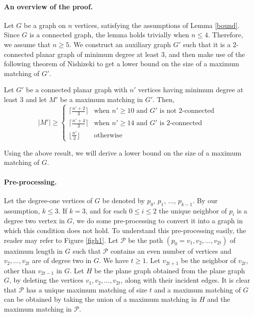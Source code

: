 \paragraph{\textbf{An overview of the proof.}}
Let $G$ be a graph on $n$ vertices, satisfying the assumptions of Lemma \ref{bound}. Since $G$ is a connected graph, the lemma holds trivially 
when $n \le 4$. Therefore, we assume that $n \ge 5$. We construct an auxiliary graph $G'$ such that it is a $2$-connected planar graph of minimum 
degree at least $3$, and then make use of the following theorem of Nishizeki \cite{Nishi} to get a lower bound on the size of a maximum matching of $G'$.
\begin{theorem}\label{thmnishi}
 Let $G'$ be a connected planar graph with $n'$ vertices having minimum degree at least $3$ and let $M'$ be a maximum matching in $G'$. Then,
$$
|M'| \ge \left\{ \begin{array}{rl}
 \lceil \frac{n'+2}{3} \rceil &\mbox{when $n' \ge 10$ and $G'$ is not 2-connected} \\
  \lceil \frac{n'+4}{3}\rceil &\mbox{when $n' \ge 14$ and $G'$ is 2-connected} \\
  \lfloor \frac{n'}{2}\rfloor &\mbox{otherwise}  
       \end{array} \right.
$$
\end{theorem}
Using the above result, we will derive a lower bound on the size of a maximum matching of $G$. 
\paragraph{\textbf{Pre-processing.}}
Let the degree-one vertices of $G$ be denoted by $p_0$, $p_1$, $\ldots$, $p_{k-1}$. By our assumption, $k \le 3$. 
If $k=3$, and for each $0 \le i \le 2$ the unique neighbor of $p_i$ is a degree two vertex in $G$, we do some pre-processing to convert it into a 
graph in which this condition does not hold. To understand this pre-processing easily, the reader may refer to Figure \ref{figh1}. Let $\mathcal{P}$ 
be the path $(p_0=v_1, v_2, \ldots, v_{2t})$ of maximum length in $G$ such that $\mathcal{P}$ contains an even number of vertices 
and $v_2, \ldots, v_{2t}$ are of degree two in $G$. We have $t \ge 1$. Let $v_{2t+1}$ be the neighbor of $v_{2t}$, other than $v_{2t-1}$ in $G$. 
Let $H$ be the plane graph obtained from the plane graph $G$, by deleting the vertices $v_1, v_2, \ldots, v_{2t}$, along with their incident edges. 
It is clear that $\mathcal{P}$ has a unique maximum matching of size $t$ and a maximum matching of $G$ can be obtained by taking the union of a 
maximum matching in $H$ and the maximum matching in $\mathcal{P}$.

